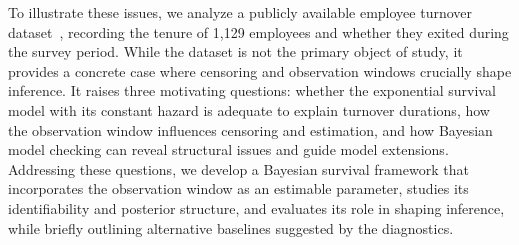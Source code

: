 To illustrate these issues, we analyze a publicly available employee turnover dataset~\cite{babushkin_employee_turnover}, recording the tenure of 1,129 employees and whether they exited during the survey period. While the dataset is not the primary object of study, it provides a concrete case where censoring and observation windows crucially shape inference. It raises three motivating questions: whether the exponential survival model with its constant hazard is adequate to explain turnover durations, how the observation window influences censoring and estimation, and how Bayesian model checking can reveal structural issues and guide model extensions. Addressing these questions, we develop a Bayesian survival framework that incorporates the observation window as an estimable parameter, studies its identifiability and posterior structure, and evaluates its role in shaping inference, while briefly outlining alternative baselines suggested by the diagnostics.
